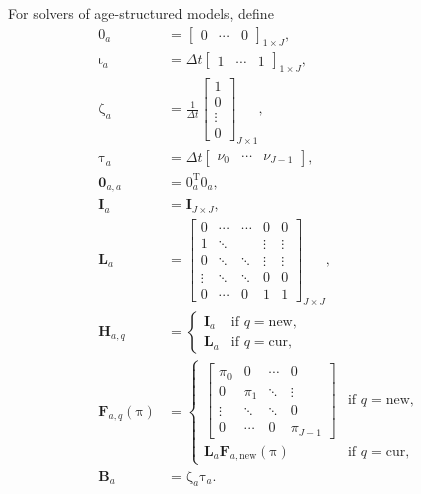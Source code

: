 \documentclass[USenglish]{article}
\renewcommand{\vec}[1]{\boldsymbol{\mathrm{#1}}}
\newcommand{\mat}[1]{\mathbf{#1}}
\begin{document}
For solvers of age-structured models, define
\begin{subequations}
  \label{definitions_age_structured}
  \begin{align}
    \vec{0}_a &=
    \begin{bmatrix}
      0 & \cdots & 0
    \end{bmatrix}_{1 \times J},
    \\
    \vec{\iota}_a &=
    \Delta t
    \begin{bmatrix}
      1 & \cdots & 1
    \end{bmatrix}_{1 \times J},
    \\
    \vec{\zeta}_a &=
    \frac{1}{\Delta t}
    \begin{bmatrix}
      1 \\ 0 \\ \vdots \\ 0
    \end{bmatrix}_{J \times 1},
    \\
    \vec{\tau}_a &=
    \Delta t
    \begin{bmatrix}
      \nu_0 & \cdots & \nu_{J - 1}
    \end{bmatrix},
    \\
    \mat{0}_{a,a} &= \vec{0}_a^{\mathrm{T}} \vec{0}_a,
    \\
    \mat{I}_a &= \mat{I}_{J \times J},
    \\
    \mat{L}_a &=
    \begin{bmatrix}
      0 & \cdots & \cdots & 0 & 0 \\
      1 & \ddots & & \vdots & \vdots \\
      0 & \ddots & \ddots & \vdots & \vdots \\
      \vdots & \ddots & \ddots & 0 & 0 \\
      0 & \cdots & 0 & 1 & 1
    \end{bmatrix}_{J \times J},
    \\
    \mat{H}_{a, q} &=
    \begin{cases}
      \mat{I}_a & \text{if $q = \mathrm{new}$},
      \\
      \mat{L}_a & \text{if $q = \mathrm{cur}$},
    \end{cases}
    \\
    \mat{F}_{a, q}(\vec{\pi}) &=
    \begin{cases}
      \begin{bmatrix}
        \pi_0 & 0 & \cdots & 0 \\
        0 & \pi_1 & \ddots & \vdots \\
        \vdots & \ddots & \ddots & 0 \\
        0 & \cdots & 0 & \pi_{J - 1}
      \end{bmatrix}
      & \text{if $q = \mathrm{new}$},
      \\
      \mat{L}_{a} \mat{F}_{a, \mathrm{new}}(\vec{\pi})
      & \text{if $q = \mathrm{cur}$},
    \end{cases}
    \\
    \mat{B}_a &= \vec{\zeta}_a \vec{\tau}_a.
  \end{align}
\end{subequations}
\end{document}
